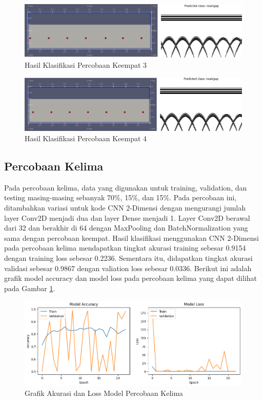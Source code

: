 \begin{figure} [H] \centering
    \includegraphics[scale=0.2]{gambar/bab4/Noarigap 19004.png}
    \caption{Hasil Klasifikasi Percobaan Keempat 3}
\end{figure}

\begin{figure} [H] \centering
    \includegraphics[scale=0.2]{gambar/bab4/Noairgap 20004.png}
    \caption{Hasil Klasifikasi Percobaan Keempat 4}
\end{figure}

\subsection{Percobaan Kelima}
Pada percobaan kelima, data yang digunakan untuk training, validation, dan testing masing-masing sebanyak 70\%, 15\%, dan 15\%. Pada percobaan ini, ditambahkan variasi untuk kode CNN 2-Dimensi dengan mengurangi jumlah layer Conv2D menjadi dua dan layer Dense menjadi 1. Layer Conv2D berawal dari 32 dan berakhir di 64 dengan MaxPooling dan BatchNormalization yang sama dengan percobaan keempat. Hasil klasifikasi menggunakan CNN 2-Dimensi pada percobaan kelima mendapatkan tingkat akurasi training sebesar 0.9154 dengan training loss sebesar 0.2236. Sementara itu, didapatkan tingkat akurasi validasi sebesar 0.9867 dengan valiation loss sebesar 0.0336. Berikut ini adalah grafik model accuracy dan model loss pada percobaan kelima yang dapat dilihat pada Gambar \ref{fig:trainres5}.

\begin{figure} [H] \centering
    \includegraphics[scale=0.5]{gambar/bab4/trainres5.png}
    \caption{Grafik Akurasi dan Loss Model Percobaan Kelima}
    \label{fig:trainres5}
\end{figure}

